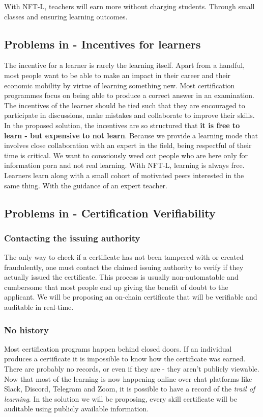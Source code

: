\documentclass{article}
\begin{document}
       With NFT-L, teachers will earn more without charging students. Through small classes and ensuring learning outcomes.
     
       
       \subsection{Problems in - Incentives for learners}
      The incentive for a learner is rarely the learning itself. Apart from a handful, most people want to be able to make an impact in their career and their economic mobility by virtue of learning something new. 
      Most certification programmes focus on being able to produce a correct answer in an examination. The incentives of the learner should be tied such that they are encouraged to participate in discussions, make mistakes and collaborate to improve their skills.
      \break
      In the proposed solution, the incentives are so structured that \textbf{it is free to learn - but expensive to not learn}. Because we provide a learning mode that involves close collaboration with an expert in the field, being respectful of their time is critical. 
      We want to consciously weed out people who are here only for information porn and not real learning.
      With NFT-L, learning is always free. Learners learn along with a small cohort of motivated peers interested in the same thing. With the guidance of an expert teacher.
      \subsection{Problems in - Certification Verifiability}
      \subsubsection{Contacting the issuing authority}
        The only way to check if a certificate has not been tampered with or created fraudulently, one must contact the claimed issuing authority to verify if they actually issued the certificate. 
        This process is usually non-automatable and cumbersome that most people end up giving the benefit of doubt to the applicant. 
        \break
        We will be proposing an on-chain certificate that will be verifiable and auditable in real-time.
      \subsubsection{No history}
        Most certification programs happen behind closed doors. If an individual produces a certificate it is impossible to know how the certificate was earned. There are probably no records, or even if they are - they aren't publicly viewable. 
        \break
        Now that most of the learning is now happening online over chat platforms like Slack, Discord, Telegram and Zoom, it is possible to have a record of the \textit{trail of learning}. In the solution we will be proposing, every skill certificate will be auditable using publicly available information.
\end{document}
